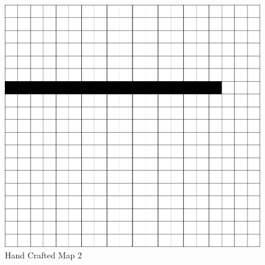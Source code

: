 \clearpage

\begin{figure}[h!]
    \centering
    \includegraphics[scale=0.82]{images/m5.png}
    \caption{Hand Crafted Map 2}
    \label{fig: rep_Hand Crafted Map 2}
\end{figure}

